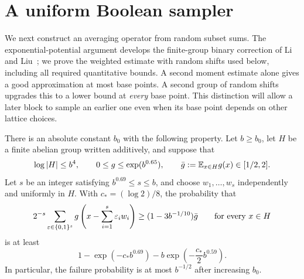\section{A uniform Boolean sampler}
\label{sec:sampler}

We next construct an averaging operator from random subset sums. The
exponential-potential argument develops the finite-group binary correction
of Li and Liu~\cite[Theorem~4.1]{LLC}; we prove the weighted estimate with
random shifts used below, including all required quantitative bounds. A second
moment estimate alone gives a good approximation at most base points. A
second group of random shifts upgrades this to a lower bound at \emph{every}
base point. This distinction will allow a later block to sample an earlier
one even when its base point depends on other lattice choices.

\begin{lemma}
\label{lem:sampler}
There is an absolute constant $b_0$ with the following property. Let
$b\ge b_0$, let $H$ be a finite abelian group written additively, and suppose
that
\[
  \log |H|\le b^4,
  \qquad 0\le g\le \exp(b^{0.65}),
  \qquad \bar g:=\mathbb E_{x\in H}g(x)\in[1/2,2].
\]
Let $s$ be an integer satisfying $b^{0.69}\le s\le b$, and choose
$w_1,\ldots,w_s$ independently and uniformly in $H$. With
$c_*=(\log 2)/8$, the probability that
\begin{equation}
\label{eq:sampler-conclusion}
  2^{-s}\sum_{\varepsilon\in\{0,1\}^s}
  g\left(x-\sum_{i=1}^s\varepsilon_iw_i\right)
  \ge (1-3b^{-1/10})\bar g
  \qquad\text{for every }x\in H
\end{equation}
is at least
\begin{equation}
\label{eq:sampler-probability}
  1-\exp(-c_*b^{0.69})
    -b\exp\left(-\frac{c_*}{2}b^{0.59}\right).
\end{equation}
In particular, the failure probability is at most $b^{-1/2}$ after
increasing $b_0$.
\end{lemma}

